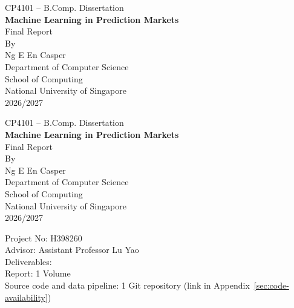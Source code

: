 \documentclass[12pt,a4paper,oneside]{report}
\newcommand{\ProjTitle}{Machine Learning in Prediction Markets}
\newcommand{\ProjAuthor}{Ng E En Casper}
\newcommand{\ProjYear}{2026/2027}
\newcommand{\ProjNo}{H398260}
\newcommand{\ProjAdvisor}{Assistant Professor Lu Yao}   %
\begin{document}
\pagestyle{empty}
\begin{titlepage}
\centering
\vspace*{3cm}
{\large CP4101 -- B.Comp. Dissertation}\\[3.5cm]
{\LARGE\bfseries \ProjTitle}\\[1cm]{\large Final Report}\\[2.5cm]
{\large By}\\[0.6cm]
{\large \ProjAuthor}\\[4cm]
{\large Department of Computer Science}\\[0.3cm]
{\large School of Computing}\\[0.3cm]
{\large National University of Singapore}\\[0.6cm]
{\large \ProjYear}
\end{titlepage}

\begin{titlepage}
\centering
\vspace*{1.5cm}
{\large CP4101 -- B.Comp. Dissertation}\\[1.5cm]
{\LARGE\bfseries \ProjTitle}\\[0.8cm]{\large Final Report}\\[1.2cm]
{\large By}\\[0.5cm]
{\large \ProjAuthor}\\[2cm]
{\large Department of Computer Science}\\[0.3cm]
{\large School of Computing}\\[0.3cm]
{\large National University of Singapore}\\[0.5cm]
{\large \ProjYear}\\[2cm]
\begin{flushleft}
\hspace{1.5cm}Project No: \ProjNo\\
\hspace{1.5cm}Advisor: \ProjAdvisor\\[0.6cm]
\hspace{1.5cm}Deliverables:\\
\hspace{3cm}Report: 1 Volume\\
\hspace{3cm}Source code and data pipeline: 1 Git repository (link in Appendix~\ref{sec:code-availability})\\
\end{flushleft}
\end{titlepage}
\end{document}
